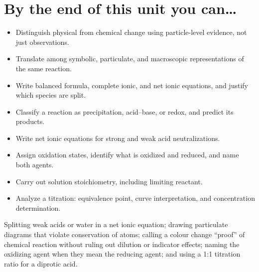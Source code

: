 \documentclass{apchem-worksheet}
\begin{document}
\vspace{0.5em}
\section*{\sffamily By the end of this unit you can\ldots}

\begin{itemize}[leftmargin=*,itemsep=0.12em]
  \item Distinguish physical from chemical change using particle-level
        evidence, not just observations. 
  \item Translate among symbolic, particulate, and macroscopic
        representations of the same reaction. 
  \item Write balanced formula, complete ionic, and net ionic equations, and
        justify which species are split. 
  \item Classify a reaction as precipitation, acid--base, or redox, and
        predict its products. 
  \item Write net ionic equations for strong and weak acid neutralizations.
  \item Assign oxidation states, identify what is oxidized and reduced, and
        name both agents. 
  \item Carry out solution stoichiometry, including limiting reactant.
  \item Analyze a titration: equivalence point, curve interpretation, and
        concentration determination. 
\end{itemize}

\begin{apctrap}
Splitting weak acids or water in a net ionic equation; drawing particulate
diagrams that violate conservation of atoms; calling a colour change
``proof'' of chemical reaction without ruling out dilution or indicator
effects; naming the oxidizing agent when they mean the reducing agent; and
using a 1:1 titration ratio for a diprotic acid.
\end{apctrap}
\end{document}
